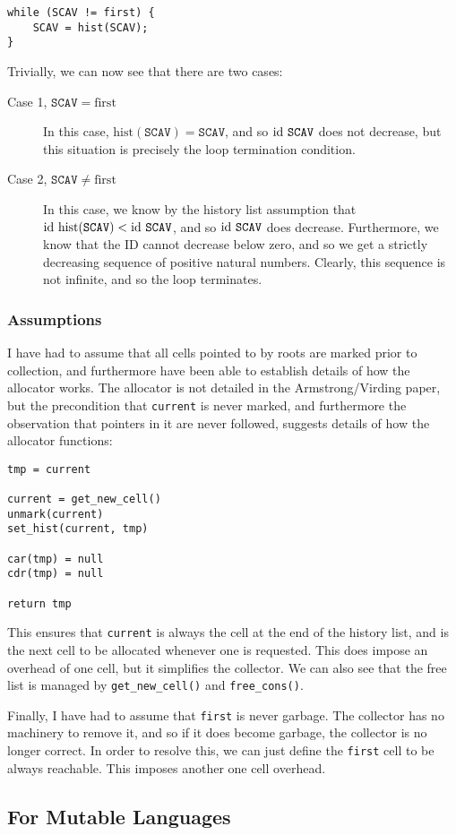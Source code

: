 \begin{lstlisting}
while (SCAV != first) {
    SCAV = hist(SCAV);
}
\end{lstlisting}

Trivially, we can now see that there are two cases:

\begin{description}
  \item[Case 1, $\mathtt{SCAV} = \mathrm{first}$] In this case,
    $\mathrm{hist}(\mathtt{SCAV}) = \mathtt{SCAV}$, and so
    $\mathrm{id}~\mathtt{SCAV}$ does not decrease, but this situation is
    precisely the loop termination condition.

  \item[Case 2, $\mathtt{SCAV} \neq \mathrm{first}$] In this case, we
    know by the history list assumption that
    $\mathrm{id}~\mathrm{hist}(\mathtt{SCAV}) < \mathrm{id}~\mathtt{SCAV}$, and so
    $\mathrm{id}~\mathtt{SCAV}$ does decrease. Furthermore, we know that the
    ID cannot decrease below zero, and so we get a strictly decreasing
    sequence of positive natural numbers. Clearly, this sequence is
    not infinite, and so the loop terminates.
\end{description}

\subsubsection{Assumptions}

I have had to assume that all cells pointed to by roots are marked
prior to collection, and furthermore have been able to establish
details of how the allocator works. The allocator is not detailed in
the Armstrong/Virding paper, but the precondition that
\texttt{current} is never marked, and furthermore the observation that
pointers in it are never followed, suggests details of how the
allocator functions:

\begin{lstlisting}
tmp = current

current = get_new_cell()
unmark(current)
set_hist(current, tmp)

car(tmp) = null
cdr(tmp) = null

return tmp
\end{lstlisting}

This ensures that \texttt{current} is always the cell at the end of
the history list, and is the next cell to be allocated whenever one is
requested. This does impose an overhead of one cell, but it simplifies
the collector. We can also see that the free list is managed by
\texttt{get\_new\_cell()} and \texttt{free\_cons()}.

Finally, I have had to assume that \texttt{first} is never
garbage. The collector has no machinery to remove it, and so if it
does become garbage, the collector is no longer correct. In order to
resolve this, we can just define the \texttt{first} cell to be always
reachable. This imposes another one cell overhead.

\subsection{For Mutable Languages}


